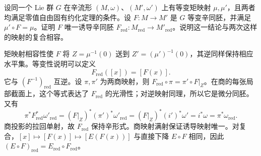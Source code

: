 \begin{exercise}\label{g4:ex:1002:reduction-naturality}
	设同一个 Lie 群 \(G\) 在辛流形 \((M,\omega)\)、\((M',\omega')\) 上有等变矩映射 \(\mu,\mu'\)，且两者均满足零值自由固有约化定理的条件。设 \(F:M\to M'\) 是 \(G\) 等变辛同胚，并满足 \(\mu'\circ F=\mu\)。证明 \(F\) 唯一诱导辛同胚 \(F_{\mathrm{red}}:M_{\mathrm{red}}\to M'_{\mathrm{red}}\)。说明这一结论与两次这样的映射的复合相容。
\end{exercise}
\begin{solution}
	矩映射相容性使 \(F\) 将 \(Z=\mu^{-1}(0)\) 送到 \(Z'=(\mu')^{-1}(0)\)，其逆同样保持相应水平集。等变性说明可以定义
	\[
		F_{\mathrm{red}}([x])=[F(x)].
	\]
	它与 \((F^{-1})_{\mathrm{red}}\) 互逆。设 \(\pi,\pi'\) 为两商映射，则 \(F_{\mathrm{red}}\circ\pi=\pi'\circ F|_Z\)。在商的每张局部截面上，这个等式表达了 \(F_{\mathrm{red}}\) 的光滑性；对逆映射同理，所以它是微分同胚。又有
	\[
		\pi^*F_{\mathrm{red}}^*\omega'_{\mathrm{red}}
		=(F|_Z)^*(\pi')^*\omega'_{\mathrm{red}}
		=(F|_Z)^*(i')^*\omega'
		=i^*\omega=\pi^*\omega_{\mathrm{red}}.
	\]
	商投影的拉回单射，故 \(F_{\mathrm{red}}\) 保持辛形式。商映射满射保证诱导映射唯一。对复合，\([x]\mapsto[F(x)]\mapsto[E(F(x))]\) 与直接下降 \(E\circ F\) 相同，因此 \((E\circ F)_{\mathrm{red}}=E_{\mathrm{red}}\circ F_{\mathrm{red}}\)。
\end{solution}

